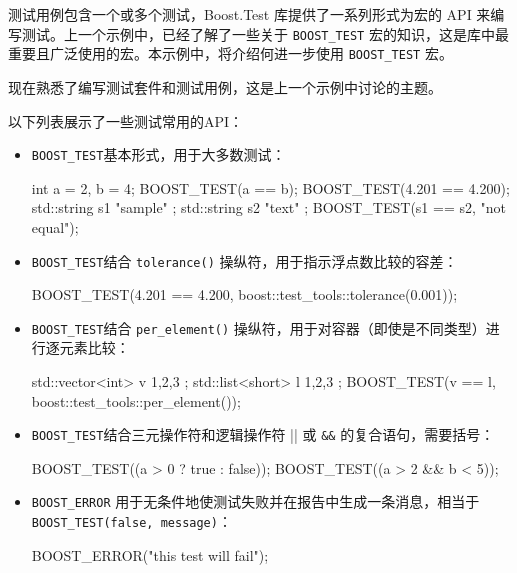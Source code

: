 
测试用例包含一个或多个测试，Boost.Test 库提供了一系列形式为宏的 API 来编写测试。上一个示例中，已经了解了一些关于 \verb|BOOST_TEST| 宏的知识，这是库中最重要且广泛使用的宏。本示例中，将介绍何进一步使用 \verb|BOOST_TEST| 宏。


现在熟悉了编写测试套件和测试用例，这是上一个示例中讨论的主题。


以下列表展示了一些测试常用的API：

\begin{itemize}
\item
\verb|BOOST_TEST|基本形式，用于大多数测试：

\begin{cpp}
int a = 2, b = 4;
BOOST_TEST(a == b);
BOOST_TEST(4.201 == 4.200);
std::string s1{ "sample" };
std::string s2{ "text" };
BOOST_TEST(s1 == s2, "not equal");
\end{cpp}

\item
\verb|BOOST_TEST|结合 \verb|tolerance()| 操纵符，用于指示浮点数比较的容差：

\begin{cpp}
BOOST_TEST(4.201 == 4.200, boost::test_tools::tolerance(0.001));
\end{cpp}

\item
\verb|BOOST_TEST|结合 \verb|per_element()| 操纵符，用于对容器（即使是不同类型）进行逐元素比较：

\begin{cpp}
std::vector<int> v{ 1,2,3 };
std::list<short> l{ 1,2,3 };
BOOST_TEST(v == l, boost::test_tools::per_element());
\end{cpp}

\item
\verb|BOOST_TEST|结合三元操作符和逻辑操作符 || 或 \verb|&&| 的复合语句，需要括号：

\begin{cpp}
BOOST_TEST((a > 0 ? true : false));
BOOST_TEST((a > 2 && b < 5));
\end{cpp}

\item
\verb|BOOST_ERROR| 用于无条件地使测试失败并在报告中生成一条消息，相当于 \verb|BOOST_TEST(false, message)|：

\begin{cpp}
BOOST_ERROR("this test will fail");
\end{cpp}


\end{itemize}
